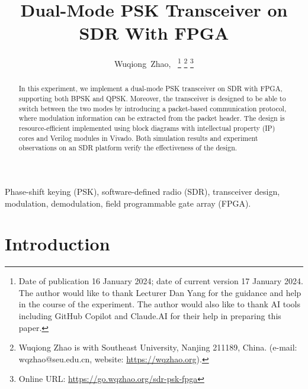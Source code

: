 \documentclass[journal,twoside]{IEEEtran}
\begin{document}
  \title{Dual-Mode PSK Transceiver on SDR With FPGA}

  \author{%
    Wuqiong~Zhao{\hspace{.1em}\textsuperscript{}},~
    \thanks{Date of publication 16 January 2024; date of current version 17 January 2024.
      The author would like to thank Lecturer Dan Yang for the guidance and help in the course of the experiment.
      The author would also like to thank AI tools including GitHub Copilot and Claude.AI for their help in preparing this paper.}
    \thanks{Wuqiong Zhao is with Southeast University, Nanjing 211189, China. (e-mail: wqzhao@seu.edu.cn, website: \url{https://wqzhao.org}).}
    \thanks{Online URL: \url{https://go.wqzhao.org/sdr-psk-fpga}}
  }

  \maketitle

  \begin{abstract}
    In this experiment, we implement a dual-mode PSK transceiver on SDR with FPGA,
    supporting both BPSK and QPSK.
    Moreover, the transceiver is designed to be able to switch between the two modes by introducing a packet-based communication protocol,
    where modulation information can be extracted from the packet header.
    The design is resource-efficient implemented using block diagrams with intellectual property (IP) cores and Verilog modules in Vivado.
    Both simulation results and experiment observations on an SDR platform verify the effectiveness of the design.
  \end{abstract}
  \begin{IEEEkeywords}
    Phase-shift keying (PSK), software-defined radio (SDR), transceiver design, modulation, demodulation, field programmable gate array (FPGA).
  \end{IEEEkeywords}

  \section{Introduction}
\end{document}
